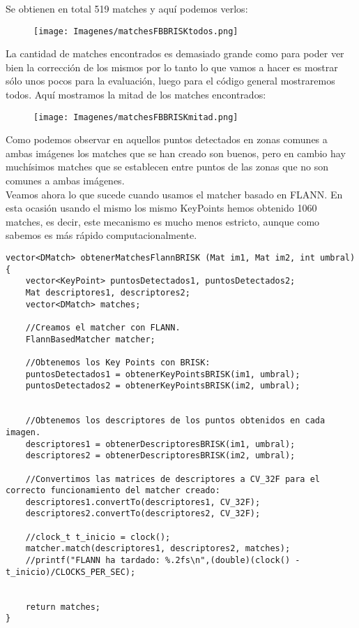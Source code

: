 \documentclass[10pt,a4paper]{article}
\begin{document}
Se obtienen en total 519 matches y aquí podemos verlos:\\

\begin{figure}[H]
\centering
\texttt{[image: Imagenes/matchesFBBRISKtodos.png]}
\end{figure}

La cantidad de matches encontrados es demasiado grande como para poder ver bien la corrección de los mismos por lo tanto lo que vamos a hacer es mostrar sólo unos pocos para la evaluación, luego para el código general mostraremos todos. Aquí mostramos la mitad de los matches encontrados:\\

\begin{figure}[H]
\centering
\texttt{[image: Imagenes/matchesFBBRISKmitad.png]}
\end{figure}

Como podemos observar en aquellos puntos detectados en zonas comunes a ambas imágenes los matches que se han creado son buenos, pero en cambio hay muchísimos matches que se establecen entre puntos de las zonas que no son comunes a ambas imágenes.\\

Veamos ahora lo que sucede cuando usamos el matcher basado en FLANN. En esta ocasión usando el mismo los mismo KeyPoints hemos obtenido 1060 matches, es decir, este mecanismo es mucho menos estricto, aunque como sabemos es más rápido computacionalmente.\\

\begin{lstlisting}
vector<DMatch> obtenerMatchesFlannBRISK (Mat im1, Mat im2, int umbral){
	vector<KeyPoint> puntosDetectados1, puntosDetectados2;
	Mat descriptores1, descriptores2;
	vector<DMatch> matches;
	
	//Creamos el matcher con FLANN.
	FlannBasedMatcher matcher;
	
	//Obtenemos los Key Points con BRISK:
	puntosDetectados1 = obtenerKeyPointsBRISK(im1, umbral);
	puntosDetectados2 = obtenerKeyPointsBRISK(im2, umbral);
	
	
	//Obtenemos los descriptores de los puntos obtenidos en cada imagen.
	descriptores1 = obtenerDescriptoresBRISK(im1, umbral);
	descriptores2 = obtenerDescriptoresBRISK(im2, umbral);
	
	//Convertimos las matrices de descriptores a CV_32F para el correcto funcionamiento del matcher creado:
	descriptores1.convertTo(descriptores1, CV_32F);
	descriptores2.convertTo(descriptores2, CV_32F);
	
	//clock_t t_inicio = clock();
	matcher.match(descriptores1, descriptores2, matches);
	//printf("FLANN ha tardado: %.2fs\n",(double)(clock() - t_inicio)/CLOCKS_PER_SEC);
		
	
	return matches;
}
\end{lstlisting}
\end{document}
